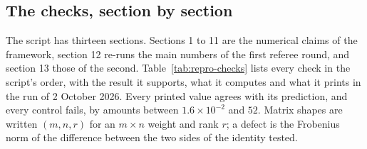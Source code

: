\subsection{The checks, section by section}\label{app:repro-checks}

The script has thirteen sections. Sections 1 to 11 are the numerical claims of the framework, section 12 re-runs the
main numbers of the first referee round, and section 13 those of the second. Table~\ref{tab:repro-checks} lists every
check in the script's order, with the result it supports, what it computes and what it prints in the run of
2 October 2026. Every printed value agrees with its prediction, and every control fails, by amounts between
$1.6\times10^{-2}$ and $52$. Matrix shapes are written $(m,n,r)$ for an $m\times n$ weight and rank $r$; a defect is the
Frobenius norm of the difference between the two sides of the identity tested.

